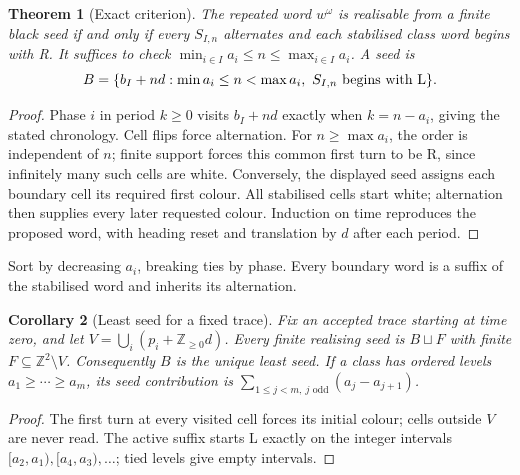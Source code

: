 \documentclass[11pt,letterpaper]{article}
\newtheorem{theorem}{Theorem}[section]
\newtheorem{corollary}[theorem]{Corollary}
\newcommand{\Z}{\mathbb Z}
\begin{document}
\begin{theorem}[Exact criterion]\label{thm:criterion}
The repeated word $w^\omega$ is realisable from a finite black seed if
and only if every $S_{I,n}$ alternates and each stabilised class word
begins with R. It suffices to check
$\min_{i\in I}a_i\le n\le\max_{i\in I}a_i$. A seed is
\[
B=\{b_I+nd:\min a_i\le n<\max a_i,\ S_{I,n}\hbox{ begins with L}\}.
\]
\end{theorem}
\begin{proof}
Phase $i$ in period $k\ge0$ visits $b_I+nd$ exactly when $k=n-a_i$,
giving the stated chronology. Cell flips force alternation. For
$n\ge\max a_i$, the order is independent of $n$; finite support forces
this common first turn to be R, since infinitely many such cells are white.
Conversely, the displayed seed assigns each boundary cell its required
first colour. All stabilised cells start white; alternation then supplies
every later requested colour. Induction on time reproduces the proposed
word, with heading reset and translation by $d$ after each period.
\end{proof}
Sort by decreasing $a_i$, breaking ties by phase. Every boundary word
is a suffix of the stabilised word and inherits its alternation.

\begin{corollary}[Least seed for a fixed trace]\label{cor:leastseed}
Fix an accepted trace starting at time zero, and let $V=\bigcup_i(p_i+\Z_{\ge0}d)$.
Every finite realising seed is $B\sqcup F$ with finite $F\subseteq\Z^2\setminus V$.
Consequently $B$ is the unique least seed. If a class has ordered levels
$a_1\ge\cdots\ge a_m$, its seed contribution is
$\sum_{1\le j<m,\ j\text{ odd}}(a_j-a_{j+1})$.
\end{corollary}
\begin{proof}
The first turn at every visited cell forces its initial colour; cells outside
$V$ are never read. The active suffix starts L exactly on the integer
intervals $[a_2,a_1),[a_4,a_3),\ldots$; tied levels give empty intervals.
\end{proof}
\end{document}
